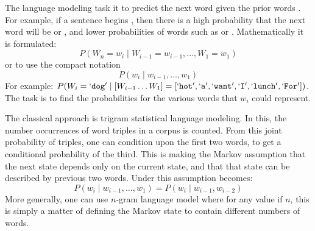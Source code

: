 \documentclass[parskip]{komatufte}
\begin{document}

The language modeling task it to predict the next word given the prior words .
For example, if a sentence begins , then there is a high probability that the next word will be  or ,
and lower probabilities of words such as  or .
Mathematically it is formulated: 
\begin{equation}\label{equ:langmodel}
	P(W_n{=}w_i \mid W_{i-1}{=}w_{i-1}, \ldots, W_1{=}w_1)
\end{equation}
or to use the compact notation 
\begin{equation}\label{equ:langmodelcompact}
P(w_i \mid w_{i-1}, \ldots, w_1)
\end{equation}
For example: $P(W_i=`\texttt{dog}' \mid [W_{i-1} \ldots W_{1}] = [`\texttt{hot}', `\texttt{a}', `\texttt{want}', `\texttt{I}', `\texttt{lunch}', `\texttt{For}'])$.
The task is to find the probabilities for the various words that $w_i$ could represent.


  
The classical approach is trigram statistical language modeling.
In this, the number occurrences of word triples in a corpus is counted.
From this joint probability of triples, one can condition upon the first two words,
to get a conditional probability of the third.
This is making the Markov assumption that the next state depends only on the current state,
and that that state can be described by previous two words.
Under this assumption  becomes:
\begin{equation}\label{equ:trigramlangmodel}
P(w_i \mid w_{i-1}, \ldots, w_1) = P(w_i \mid w_{i-1}, w_{i-2})
\end{equation}
More generally, one can use $n$-gram language model where for any value if $n$,
this is simply a matter of defining the Markov state to contain different numbers of words.
\end{document}

